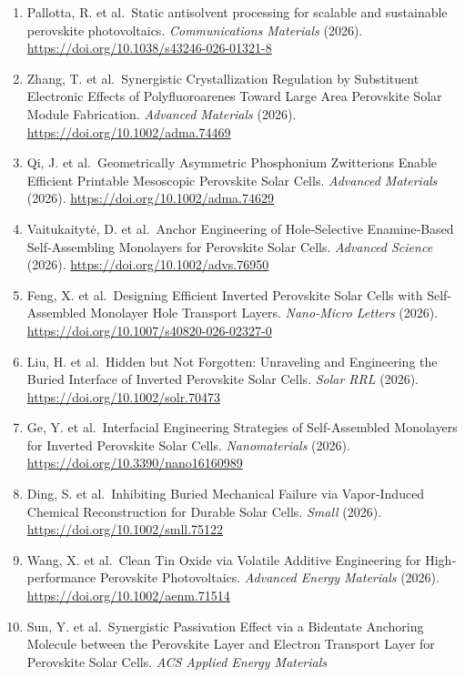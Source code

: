 \documentclass[
  11pt,
]{article}
\begin{document}
\begin{enumerate}
  Solar Cells. \emph{Angewandte Chemie International Edition} (2026).
  \url{https://doi.org/10.1002/anie.3095986}
\item
  Pallotta, R. et al.~Static antisolvent processing for scalable and
  sustainable perovskite photovoltaics. \emph{Communications Materials}
  (2026). \url{https://doi.org/10.1038/s43246-026-01321-8}
\item
  Zhang, T. et al.~Synergistic Crystallization Regulation by Substituent
  Electronic Effects of Polyfluoroarenes Toward Large Area Perovskite
  Solar Module Fabrication. \emph{Advanced Materials} (2026).
  \url{https://doi.org/10.1002/adma.74469}
\item
  Qi, J. et al.~Geometrically Asymmetric Phosphonium Zwitterions Enable
  Efficient Printable Mesoscopic Perovskite Solar Cells. \emph{Advanced
  Materials} (2026). \url{https://doi.org/10.1002/adma.74629}
\item
  Vaitukaitytė, D. et al.~Anchor Engineering of Hole‐Selective
  Enamine‐Based Self‐Assembling Monolayers for Perovskite Solar Cells.
  \emph{Advanced Science} (2026).
  \url{https://doi.org/10.1002/advs.76950}
\item
  Feng, X. et al.~Designing Efficient Inverted Perovskite Solar Cells
  with Self-Assembled Monolayer Hole Transport Layers. \emph{Nano-Micro
  Letters} (2026). \url{https://doi.org/10.1007/s40820-026-02327-0}
\item
  Liu, H. et al.~Hidden but Not Forgotten: Unraveling and Engineering
  the Buried Interface of Inverted Perovskite Solar Cells. \emph{Solar
  RRL} (2026). \url{https://doi.org/10.1002/solr.70473}
\item
  Ge, Y. et al.~Interfacial Engineering Strategies of Self-Assembled
  Monolayers for Inverted Perovskite Solar Cells. \emph{Nanomaterials}
  (2026). \url{https://doi.org/10.3390/nano16160989}
\item
  Ding, S. et al.~Inhibiting Buried Mechanical Failure via Vapor‐Induced
  Chemical Reconstruction for Durable Solar Cells. \emph{Small} (2026).
  \url{https://doi.org/10.1002/smll.75122}
\item
  Wang, X. et al.~Clean Tin Oxide via Volatile Additive Engineering for
  High‐performance Perovskite Photovoltaics. \emph{Advanced Energy
  Materials} (2026). \url{https://doi.org/10.1002/aenm.71514}
\item
  Sun, Y. et al.~Synergistic Passivation Effect via a Bidentate
  Anchoring Molecule between the Perovskite Layer and Electron Transport
  Layer for Perovskite Solar Cells. \emph{ACS Applied Energy Materials}

\end{enumerate}
\end{document}
